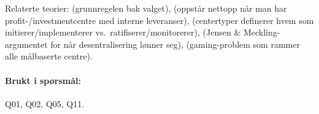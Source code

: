 Relaterte teorier:  (grunnregelen bak valget),  (oppstår nettopp når man har profit-/investmentcentre med interne leveranser),  (centertyper definerer hvem som initierer/implementerer vs.\ ratifiserer/monitorerer),  (Jensen \& Meckling-argumentet for når desentralisering lønner seg),  (gaming-problem som rammer alle målbaserte centre).

\paragraph{Brukt i spørsmål:} Q01, Q02, Q05, Q11.
